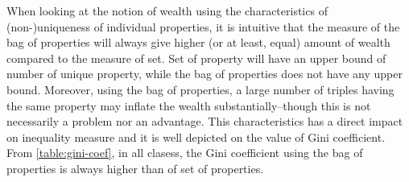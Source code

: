 \begin{center}
    \scriptsize
\end{center}

When looking at the notion of wealth using the characteristics of (non-)uniqueness of individual properties, it is intuitive that the measure of the bag of properties will always give higher (or at least, equal) amount of wealth compared to the measure of set. Set of property will have an upper bound of number of unique property, while the bag of properties does not have any upper bound. Moreover, using the bag of properties, a large number of triples having the same property may inflate the wealth substantially--though this is not necessarily a problem nor an advantage. This characteristics has a direct impact on inequality measure and it is well depicted on the value of Gini coefficient. From \autoref{table:gini-coef}, in all clasess, the Gini coefficient using the bag of properties is always higher than of set of properties.

